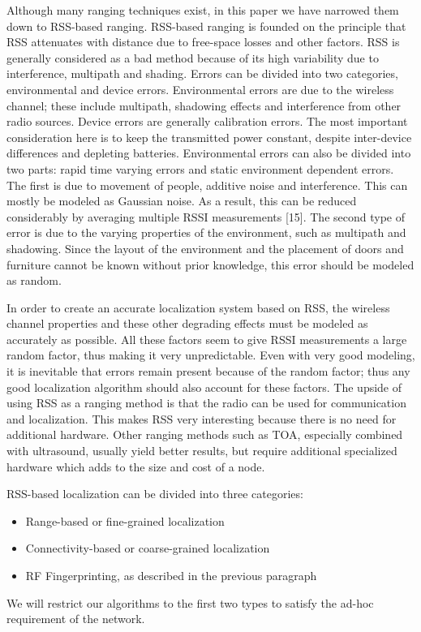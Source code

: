Although many ranging techniques exist, in this paper we have narrowed them down to RSS-based ranging. 
RSS-based ranging is founded on the principle that RSS attenuates with distance due to free-space losses and other factors. RSS is generally considered as a bad method because of its high variability due to interference, multipath and shading. Errors can be divided into two categories, environmental and device errors. Environmental errors are due to the wireless channel; these include multipath, shadowing effects and interference from other radio sources. Device errors are generally calibration errors. The most important consideration here is to keep the transmitted power constant, despite inter-device differences and depleting batteries. Environmental errors can also be divided into two parts: rapid time varying errors and static environment dependent errors. The first is due to movement of people, additive noise and interference. This can mostly be modeled as Gaussian noise. As a result, this can be reduced considerably by averaging multiple RSSI measurements [15]. The second type of error is due to the varying properties of the environment, such as multipath and shadowing. Since the layout of the environment and the placement of doors and furniture cannot be known without prior knowledge, this error should be modeled as random. 

In order to create an accurate localization system based on RSS, the wireless channel properties and these other degrading effects must be modeled as accurately as possible. All these factors seem to give RSSI measurements a large random factor, thus making it very unpredictable. Even with very good modeling, it is inevitable that errors remain present because of the random factor; thus any good localization algorithm should also account for these factors. The upside of using RSS as a ranging method is that the radio can be used for communication and localization. This makes RSS very interesting because there is no need for additional hardware. Other ranging methods such as TOA, especially combined with ultrasound, usually yield better results, but require additional specialized hardware which adds to the size and cost of a node.

RSS-based localization can be divided into three categories:
\begin{itemize}
	\item Range-based or fine-grained localization 
	\item Connectivity-based or coarse-grained localization 
	\item RF Fingerprinting, as described in the previous paragraph
\end{itemize}
We will restrict our algorithms to the first two types to satisfy the ad-hoc requirement of the network. 

